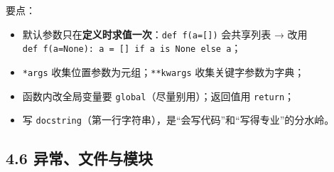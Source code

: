 \begin{Shaded}
\begin{Highlighting}[]
\OperatorTok{*}\OperatorTok{=}\OperatorTok{=}\NormalTok{):}
\OperatorTok{=} 
\OperatorTok{=}\OperatorTok{/}  
     \SpecialStringTok{f"[}\SpecialCharTok{\{}\SpecialCharTok{\}}\SpecialStringTok{] }\SpecialCharTok{\{}\SpecialCharTok{\}}\SpecialCharTok{\{}\SpecialCharTok{\}}\SpecialCharTok{\{}\OperatorTok{\%}\SpecialCharTok{\}}

\NormalTok{, [}\NormalTok{, }\NormalTok{]))}
\NormalTok{, [}\NormalTok{, }\NormalTok{], title}\OperatorTok{=}\NormalTok{))}
\end{Highlighting}
\end{Shaded}

要点：

\begin{itemize}
\tightlist
\item
  默认参数只在\textbf{定义时求值一次}：\texttt{def\ f(a={[}{]})}
  会共享列表 → 改用
  \texttt{def\ f(a=None):\ a\ =\ {[}{]}\ if\ a\ is\ None\ else\ a}；
\item
  \texttt{*args} 收集位置参数为元组；\texttt{**kwargs}
  收集关键字参数为字典；
\item
  函数内改全局变量要 \texttt{global}（尽量别用）；返回值用
  \texttt{return}；
\item
  写
  \texttt{docstring}（第一行字符串），是``会写代码''和``写得专业''的分水岭。
\end{itemize}

\subsection{4.6
异常、文件与模块}\label{ux5f02ux5e38ux6587ux4ef6ux4e0eux6a21ux5757}

